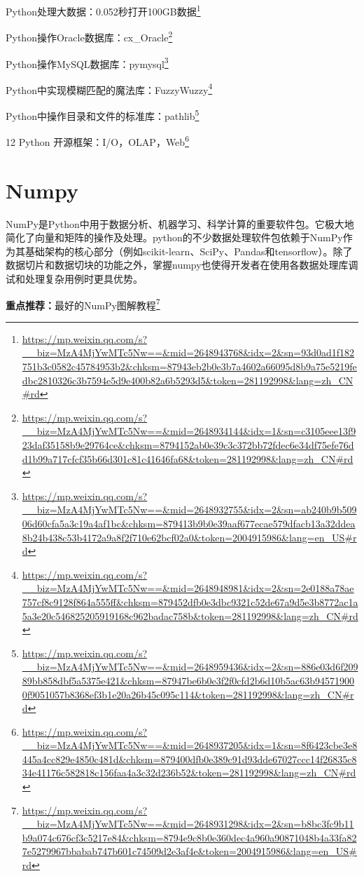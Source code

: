 \documentclass[]{ctexbook}
\renewcommand{\href}[2]{#2\footnote{\url{#1}}}
\begin{document}
\href{https://mp.weixin.qq.com/s?__biz=MzA4MjYwMTc5Nw==\&mid=2648943768\&idx=2\&sn=93d0ad1f182751b3c0582c45784953b2\&chksm=87943eb2b0e3b7a4602a66095d8b9a75e5219fedbc2810326c3b7594e5d9e400b82a6b5293d5\&token=281192998\&lang=zh_CN\#rd}{Python处理大数据：0.052秒打开100GB数据}

\href{https://mp.weixin.qq.com/s?__biz=MzA4MjYwMTc5Nw==\&mid=2648934144\&idx=1\&sn=c3105eee13f923daf35158b9e29764ce\&chksm=8794152ab0e39c3c372bb72fdec6e34df75efe76dd1b99a717cfcf35b66d301c81c41646fa68\&token=281192998\&lang=zh_CN\#rd}{Python操作Oracle数据库：cx\_Oracle}

\href{https://mp.weixin.qq.com/s?__biz=MzA4MjYwMTc5Nw==\&mid=2648932755\&idx=2\&sn=ab240b9b50906d60cfa5a3c19a4af1bc\&chksm=879413b9b0e39aaf677ecae579dfacb13a32ddea8b24b438c53b4172a9a8f2f710e62bcf02a0\&token=2004915986\&lang=en_US\#rd}{Python操作MySQL数据库：pymysql}

\href{https://mp.weixin.qq.com/s?__biz=MzA4MjYwMTc5Nw==\&mid=2648948981\&idx=2\&sn=2e0188a78ae757cf8c9128f864a555ff\&chksm=879452dfb0e3dbc9321c52de67a9d5e3b8772ac1a5a3e20c546825205919168c962badac758b\&token=281192998\&lang=zh_CN\#rd}{Python中实现模糊匹配的魔法库：FuzzyWuzzy}

\href{https://mp.weixin.qq.com/s?__biz=MzA4MjYwMTc5Nw==\&mid=2648959436\&idx=2\&sn=886e03d6f20989bb858dbf5a5375e421\&chksm=87947be6b0e3f2f0cfd2b6d10b5ac63b945719000f9051057b8368ef3b1e20a26b45c095c114\&token=281192998\&lang=zh_CN\#rd}{Python中操作目录和文件的标准库：pathlib}

\href{https://mp.weixin.qq.com/s?__biz=MzA4MjYwMTc5Nw==\&mid=2648937205\&idx=1\&sn=8f6423cbe3e8445a4cc829e4850c481d\&chksm=879400dfb0e389c91d93dde67027ccc14f26835c834e41176c582818c156faa4a3c32d236b52\&token=281192998\&lang=zh_CN\#rd}{12 Python 开源框架：I/O，OLAP，Web}

\hypertarget{numpy}{%
\section{Numpy}\label{numpy}}

NumPy是Python中用于数据分析、机器学习、科学计算的重要软件包。它极大地简化了向量和矩阵的操作及处理。python的不少数据处理软件包依赖于NumPy作为其基础架构的核心部分（例如scikit-learn、SciPy、Pandas和tensorflow）。除了数据切片和数据切块的功能之外，掌握numpy也使得开发者在使用各数据处理库调试和处理复杂用例时更具优势。

\textbf{重点推荐：}\href{https://mp.weixin.qq.com/s?__biz=MzA4MjYwMTc5Nw==\&mid=2648931298\&idx=2\&sn=b8bc3fc9b11b9a074c676cf3c5217e84\&chksm=8794e9c8b0e360dec4a960a90871048b4a33fa827e5279967bbabab747b601c74509d2e3af4e\&token=2004915986\&lang=en_US\#rd}{最好的NumPy图解教程}
\end{document}
